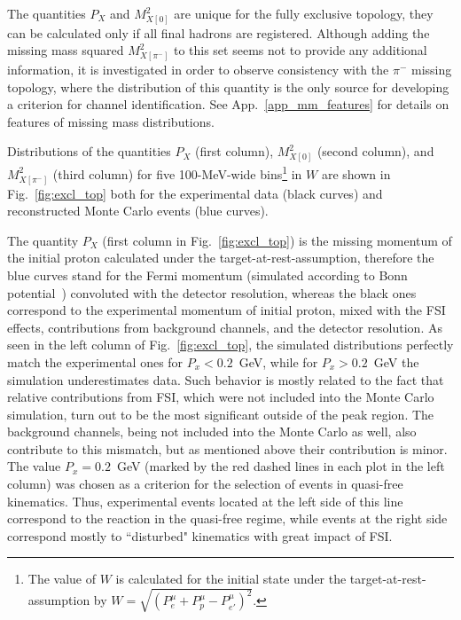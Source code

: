The quantities $P_{X}$ and $M^{2}_{X[0]}$ are unique for the fully exclusive topology, they can be calculated only if all final hadrons are registered. Although adding the missing mass squared $M_{X[\pi^{-}]}^{2}$ to this set seems not to provide any additional information, it is investigated in order to observe consistency with the $\pi^{-}$ missing topology, where the distribution of this quantity is the only source for developing a criterion for channel identification. See App.~\ref{app_mm_features} for details on features of missing mass distributions.


Distributions of the quantities $P_{X}$ (first column), $M^{2}_{X[0]}$ (second column), and $M_{X[\pi^{-}]}^{2}$ (third column) for five 100-MeV-wide bins\footnote[12]{The value of $W$ is calculated for the initial state under the target-at-rest-assumption by $W = \sqrt{(P_{e}^{\mu} + P_{p}^{\mu}- P_{e'}^{\mu})^{2}}$.} in $W$ are shown in Fig.~\ref{fig:excl_top} both for the experimental data (black curves) and reconstructed Monte Carlo events (blue curves).

The quantity $P_{X}$ (first column in Fig.~\ref{fig:excl_top}) is the missing momentum of the initial proton calculated under the target-at-rest-assumption, therefore the blue curves stand for the Fermi momentum (simulated according to Bonn potential~\cite{Machleidt:1987hj}) convoluted with the detector resolution, whereas the black ones correspond to the experimental momentum of initial proton, mixed with the FSI effects, contributions from background channels, and the detector resolution. As seen in the left column of Fig.~\ref{fig:excl_top}, the simulated distributions perfectly match the experimental ones for $P_{x} < 0.2$~GeV, while for $P_{x} > 0.2$~GeV the simulation underestimates data. Such behavior is mostly related to the fact that relative contributions from FSI, which were not included into the Monte Carlo simulation, turn out to be the most significant outside of the peak region. The background channels, being not included into the Monte Carlo as well, also contribute to this mismatch, but as mentioned above their contribution is minor.
The value  $P_{x} = 0.2$~GeV (marked by the red dashed lines in each plot in the left column) was chosen as a criterion for the selection of events in quasi-free kinematics. Thus, experimental events located at the left side of this line correspond to the reaction in the quasi-free regime, while events at the right side correspond mostly to ``disturbed" kinematics with great impact of FSI.

